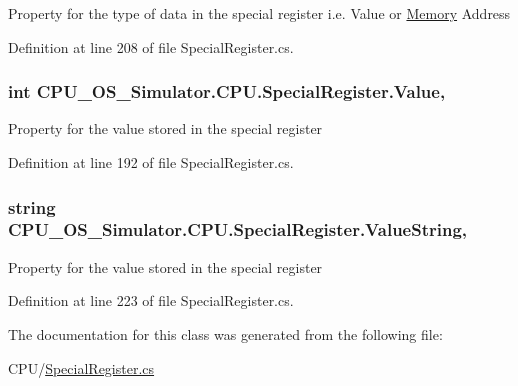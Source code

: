 Property for the type of data in the special register i.\+e. Value or \hyperlink{namespace_c_p_u___o_s___simulator_1_1_memory}{Memory} Address 



Definition at line 208 of file Special\+Register.\+cs.

\hypertarget{class_c_p_u___o_s___simulator_1_1_c_p_u_1_1_special_register_aeff33618d376eeaef1e62d6833074bd4}{}
\subsubsection[{Value}]{\setlength{\rightskip}{0pt plus 5cm}int C\+P\+U\+\_\+\+O\+S\+\_\+\+Simulator.\+C\+P\+U.\+Special\+Register.\+Value\hspace{0.3cm}{\ttfamily [get]}, {\ttfamily [set]}}\label{class_c_p_u___o_s___simulator_1_1_c_p_u_1_1_special_register_aeff33618d376eeaef1e62d6833074bd4}


Property for the value stored in the special register 



Definition at line 192 of file Special\+Register.\+cs.

\hypertarget{class_c_p_u___o_s___simulator_1_1_c_p_u_1_1_special_register_a60a2bcd516cedf8bb485c2e36bbc3235}{}
\subsubsection[{Value\+String}]{\setlength{\rightskip}{0pt plus 5cm}string C\+P\+U\+\_\+\+O\+S\+\_\+\+Simulator.\+C\+P\+U.\+Special\+Register.\+Value\+String\hspace{0.3cm}{\ttfamily [get]}, {\ttfamily [set]}}\label{class_c_p_u___o_s___simulator_1_1_c_p_u_1_1_special_register_a60a2bcd516cedf8bb485c2e36bbc3235}


Property for the value stored in the special register 



Definition at line 223 of file Special\+Register.\+cs.



The documentation for this class was generated from the following file\+:\begin{DoxyCompactItemize}
\item 
C\+P\+U/\hyperlink{_special_register_8cs}{Special\+Register.\+cs}\end{DoxyCompactItemize}
